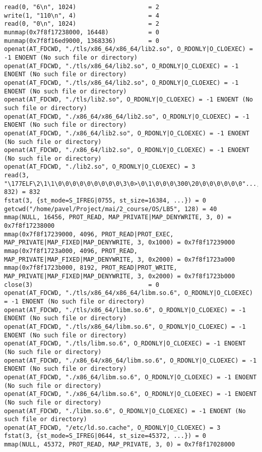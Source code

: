 \documentclass[pdf, unicode, 12pt, a4paper,oneside,fleqn]{article}
\begin{document}
{\begin{verbatim}
read(0, "6\n", 1024)                    = 2
write(1, "110\n", 4)                    = 4
read(0, "0\n", 1024)                    = 2
munmap(0x7f8f17238000, 16448)           = 0
munmap(0x7f8f16ed9000, 1368336)         = 0
openat(AT_FDCWD, "./tls/x86_64/x86_64/lib2.so", O_RDONLY|O_CLOEXEC) = -1 ENOENT (No such file or directory)
openat(AT_FDCWD, "./tls/x86_64/lib2.so", O_RDONLY|O_CLOEXEC) = -1 ENOENT (No such file or directory)
openat(AT_FDCWD, "./tls/x86_64/lib2.so", O_RDONLY|O_CLOEXEC) = -1 ENOENT (No such file or directory)
openat(AT_FDCWD, "./tls/lib2.so", O_RDONLY|O_CLOEXEC) = -1 ENOENT (No such file or directory)
openat(AT_FDCWD, "./x86_64/x86_64/lib2.so", O_RDONLY|O_CLOEXEC) = -1 ENOENT (No such file or directory)
openat(AT_FDCWD, "./x86_64/lib2.so", O_RDONLY|O_CLOEXEC) = -1 ENOENT (No such file or directory)
openat(AT_FDCWD, "./x86_64/lib2.so", O_RDONLY|O_CLOEXEC) = -1 ENOENT (No such file or directory)
openat(AT_FDCWD, "./lib2.so", O_RDONLY|O_CLOEXEC) = 3
read(3, "\177ELF\2\1\1\0\0\0\0\0\0\0\0\0\3\0>\0\1\0\0\0\300\20\0\0\0\0\0\0"..., 832) = 832
fstat(3, {st_mode=S_IFREG|0755, st_size=16384, ...}) = 0
getcwd("/home/pavel/Project/mai/2_course/OS/LB5", 128) = 40
mmap(NULL, 16456, PROT_READ, MAP_PRIVATE|MAP_DENYWRITE, 3, 0) = 0x7f8f17238000
mmap(0x7f8f17239000, 4096, PROT_READ|PROT_EXEC, MAP_PRIVATE|MAP_FIXED|MAP_DENYWRITE, 3, 0x1000) = 0x7f8f17239000
mmap(0x7f8f1723a000, 4096, PROT_READ, MAP_PRIVATE|MAP_FIXED|MAP_DENYWRITE, 3, 0x2000) = 0x7f8f1723a000
mmap(0x7f8f1723b000, 8192, PROT_READ|PROT_WRITE, MAP_PRIVATE|MAP_FIXED|MAP_DENYWRITE, 3, 0x2000) = 0x7f8f1723b000
close(3)                                = 0
openat(AT_FDCWD, "./tls/x86_64/x86_64/libm.so.6", O_RDONLY|O_CLOEXEC) = -1 ENOENT (No such file or directory)
openat(AT_FDCWD, "./tls/x86_64/libm.so.6", O_RDONLY|O_CLOEXEC) = -1 ENOENT (No such file or directory)
openat(AT_FDCWD, "./tls/x86_64/libm.so.6", O_RDONLY|O_CLOEXEC) = -1 ENOENT (No such file or directory)
openat(AT_FDCWD, "./tls/libm.so.6", O_RDONLY|O_CLOEXEC) = -1 ENOENT (No such file or directory)
openat(AT_FDCWD, "./x86_64/x86_64/libm.so.6", O_RDONLY|O_CLOEXEC) = -1 ENOENT (No such file or directory)
openat(AT_FDCWD, "./x86_64/libm.so.6", O_RDONLY|O_CLOEXEC) = -1 ENOENT (No such file or directory)
openat(AT_FDCWD, "./x86_64/libm.so.6", O_RDONLY|O_CLOEXEC) = -1 ENOENT (No such file or directory)
openat(AT_FDCWD, "./libm.so.6", O_RDONLY|O_CLOEXEC) = -1 ENOENT (No such file or directory)
openat(AT_FDCWD, "/etc/ld.so.cache", O_RDONLY|O_CLOEXEC) = 3
fstat(3, {st_mode=S_IFREG|0644, st_size=45372, ...}) = 0
mmap(NULL, 45372, PROT_READ, MAP_PRIVATE, 3, 0) = 0x7f8f17028000

\end{verbatim}}
\end{document}
